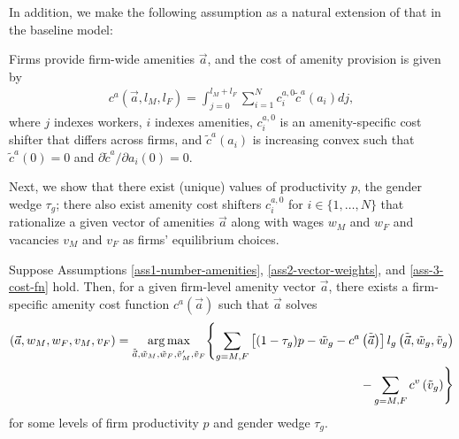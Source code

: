 In addition, we make the following assumption as a natural extension of that in the baseline model:
%
\begin{assumption}\label{ass-3-cost-fn}
    Firms provide firm-wide amenities $\vec{a}$, and the cost of amenity provision is given by
    \begin{align}
        c^{a}\left(\vec{a},l_{M},l_{F}\right)=\int_{j=0}^{l_{M}+l_{F}}\sum_{i=1}^{N}c_{i}^{a,0}\tilde{c}^{a}\left(a_{i}\right)dj,
    \end{align}
    where $j$ indexes workers, $i$ indexes amenities, $c_{i}^{a,0}$ is an amenity-specific cost shifter that differs across firms, and
    $\tilde{c}^{a}\left(a_{i}\right)$ is increasing convex such that $\tilde{c}^{a}(0)=0$ and $\partial\tilde{c}^{a}/\partial a_{i}(0)=0$.
\end{assumption}
%
Next, we show that there exist (unique) values of productivity $p$, the gender wedge $\tau_g$; there also exist amenity cost shifters $c_{i}^{a,0}$ for $i\in\{1, \ldots, N\}$ that rationalize a given vector of amenities $\vec{a}$ along with wages $w_{M}$ and $w_{F}$ and vacancies $v_{M}$ and $v_{F}$ as firms' equilibrium choices.
%
\newcommand{\LemmaObservationalEquivalence}{%
    Suppose Assumptions \ref{ass1-number-amenities}, \ref{ass2-vector-weights}, and \ref{ass-3-cost-fn} hold. Then, for a given firm-level amenity vector $\vec{a}$, there exists a firm-specific amenity cost function $c^{a}\left(\vec{a}\right)$ such that $\vec{a}$ solves
    \begin{align}
        \left(\vec{a},w_{M},w_{F},v_{M},v_{F}\right) = \argmax_{\tilde{\vec{a}},\tilde{w}_{M},\tilde{w}_{F},\tilde{v}_{M}',\tilde{v}_{F}} \Biggl\{ \sum_{g=M,F} \left[ (1-\tau_g) p-\tilde{w}_{g} -c^{a}\left(\tilde{\vec{a}}\right) \right] l_{g} \left( \tilde{\vec{a}},\tilde{w}_{g},\tilde{v}_{g} \right) \notag \\
        \quad - \sum_{g=M,F}c^{v} \left(\tilde{v}_{g}\right) \Biggr\}
    \end{align}
    for some levels of firm productivity $p$ and gender wedge $\tau_g$.
}
%
\begin{lemma}
    \label{lemma-cost-fn}
    \LemmaObservationalEquivalence
\end{lemma}
%
